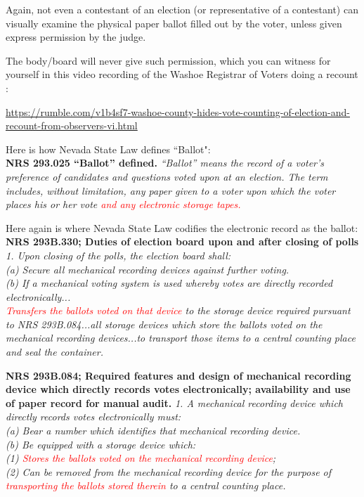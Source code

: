 \documentclass[preprint,13pt]{elsarticle}
\begin{document}
Again, not even a contestant of an election (or representative of a contestant) can visually examine the physical paper ballot filled out by the voter, unless given express permission by the judge.

The body/board will never give such permission, which you can witness for yourself in this video recording of the Washoe Registrar of Voters doing a recount :

\url{https://rumble.com/v1b4sf7-washoe-county-hides-vote-counting-of-election-and-recount-from-observers-vi.html}

Here is how Nevada State Law defines ``Ballot":\\
\textbf{NRS 293.025 “Ballot” defined.}
\textit{“Ballot” means the record of a voter’s preference of candidates and questions voted upon at an election. The term includes, without limitation, any paper given to a voter upon which the voter places his or her vote \textcolor{red}{and any electronic storage tapes.}}

Here again is where Nevada State Law codifies the electronic record as the ballot:\\
\textbf{NRS 293B.330; Duties of election board upon and after closing of polls}\\
\textit{1. Upon closing of the polls, the election board shall:\\
(a) Secure all mechanical recording devices against further voting.\\
(b) If a mechanical voting system is used whereby votes are directly recorded electronically...}\\
\textit{\textcolor{red}{Transfers the ballots voted on that device} to the storage device required pursuant to NRS 293B.084...all storage devices which store the ballots voted on the mechanical recording devices...to transport those items to a central counting place and seal the container.}

\textbf{NRS 293B.084; Required features and design of mechanical recording device which directly records votes electronically; availability and use of paper record for manual audit.}
\textit{1. A mechanical recording device which directly records votes electronically must:\\
(a) Bear a number which identifies that mechanical recording device.\\
(b) Be equipped with a storage device which:\\
(1) \textcolor{red}{Stores the ballots voted on the mechanical recording device};\\
(2) Can be removed from the mechanical recording device for the purpose of \textcolor{red}{transporting the ballots stored therein} to a central counting place.}
\end{document}
